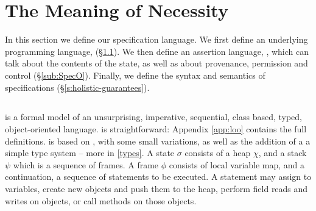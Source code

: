 \section{The Meaning of Necessity}
\label{s:semantics}

 
In this section we define our \Nec specification language.  We first
define an underlying programming language, \Loo (\S \ref{sub:Loo}).
We then define an assertion language, \SpecO, which can talk about the
contents of the state, as well as about provenance, permission and
control (\S \ref{sub:SpecO}).  Finally, we define the syntax and
semantics of  \Nec
specifications (\S \ref{s:holistic-guarantees}).


\subsection{\Loo}
\label{sub:Loo} 
 \Loo is a formal model of an unsurprising, imperative, sequential, 
class based, typed, object-oriented language.
\Loo is straightforward:
Appendix \ref{app:loo} contains 
the full definitions.
\Loo is based on \LangOO 
\cite{FASE}, with some small variations, as well as 
the addition of a %
 a simple type system -- more in \ref{types}.
%
%
A \Loo state $\sigma$ consists of a 
heap $\chi$, and a  {stack $\psi$ which is a sequence of frames}.
A frame $\phi$ consists of
local variable map, and a continuation, \ie a sequence of statements to be executed.
 A statement may assign to variables, create new objects and push them to the heap, 
perform field reads and writes on objects,  or
 call methods on those objects. 

